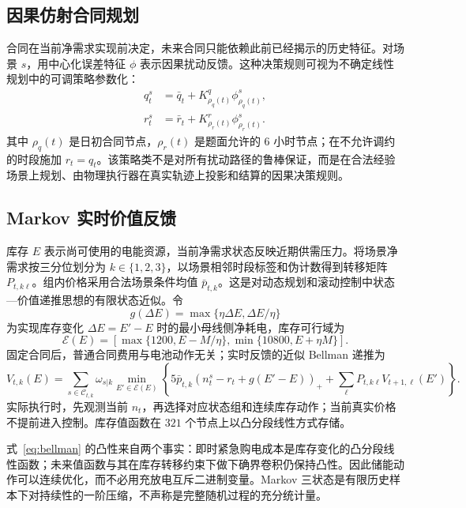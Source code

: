 \documentclass[UTF8,a4paper,zihao=-4,fontset=mac]{ctexart}
\newcommand{\pos}[1]{\left(#1\right)_+}
\begin{document}
\subsection{因果仿射合同规划}
合同在当前净需求实现前决定，未来合同只能依赖此前已经揭示的历史特征。对场景 $s$，用中心化误差特征 $\phi$ 表示因果扰动反馈。这种决策规则可视为不确定线性规划中的可调策略参数化\cite{adjustable}：
\begin{align}
q_t^s&=\bar q_t+K^q_{\rho_q(t)}\phi^s_{\rho_q(t)},\\
r_t^s&=\bar r_t+K^r_{\rho_r(t)}\phi^s_{\rho_r(t)}.
\end{align}
其中 $\rho_q(t)$ 是日初合同节点，$\rho_r(t)$ 是题面允许的 $6$ 小时节点；在不允许调约的时段施加 $r_t=q_t$。该策略类不是对所有扰动路径的鲁棒保证，而是在合法经验场景上规划、由物理执行器在真实轨迹上投影和结算的因果决策规则。

\subsection{Markov 实时价值反馈}
库存 $E$ 表示尚可使用的电能资源，当前净需求状态反映近期供需压力。将场景净需求按三分位划分为 $k\in\{1,2,3\}$，以场景相邻时段标签和伪计数得到转移矩阵 $P_{t,k\ell}$。组内价格采用合法场景条件均值 $\bar p_{t,k}$。这是对动态规划和滚动控制中状态—价值递推思想的有限状态近似\cite{bertsekas,rawlings}。令
\begin{equation}
g(\Delta E)=\max\{\eta\Delta E,\Delta E/\eta\}
\end{equation}
为实现库存变化 $\Delta E=E'-E$ 时的最小母线侧净耗电，库存可行域为
\begin{equation}
\mathcal E(E)=[\max\{1200,E-M/\eta\},\min\{10800,E+\eta M\}].
\end{equation}
固定合同后，普通合同费用与电池动作无关；实时反馈的近似 Bellman 递推为
\begin{equation}\label{eq:bellman}
V_{t,k}(E)=\sum_{s\in\mathcal C_{t,k}}\omega_{s|k}
\min_{E'\in\mathcal E(E)}\left\{5\bar p_{t,k}\pos{n_t^s-r_t+g(E'-E)}+\sum_{\ell}P_{t,k\ell}V_{t+1,\ell}(E')\right\}.
\end{equation}
实际执行时，先观测当前 $n_t$，再选择对应状态组和连续库存动作；当前真实价格不提前进入控制。库存值函数在 $321$ 个节点上以凸分段线性方式存储。

式~\eqref{eq:bellman} 的凸性来自两个事实：即时紧急购电成本是库存变化的凸分段线性函数；未来值函数与其在库存转移约束下做下确界卷积仍保持凸性。因此储能动作可以连续优化，而不必用充放电互斥二进制变量。Markov 三状态是有限历史样本下对持续性的一阶压缩，不声称是完整随机过程的充分统计量。
\end{document}

